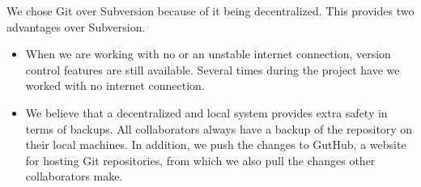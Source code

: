 We chose Git over Subversion because of it being decentralized. This provides two advantages over Subversion.

\begin{itemize}
\item When we are working with no or an unstable internet connection, version control features are still available. Several times during the project have we worked with no internet connection.
\item We believe that a decentralized and local system provides extra safety in terms of backups. All collaborators always have a backup of the repository on their local machines. In addition, we push the changes to GutHub, a website for hosting Git repositories, from which we also pull the changes other collaborators make.
\end{itemize}

